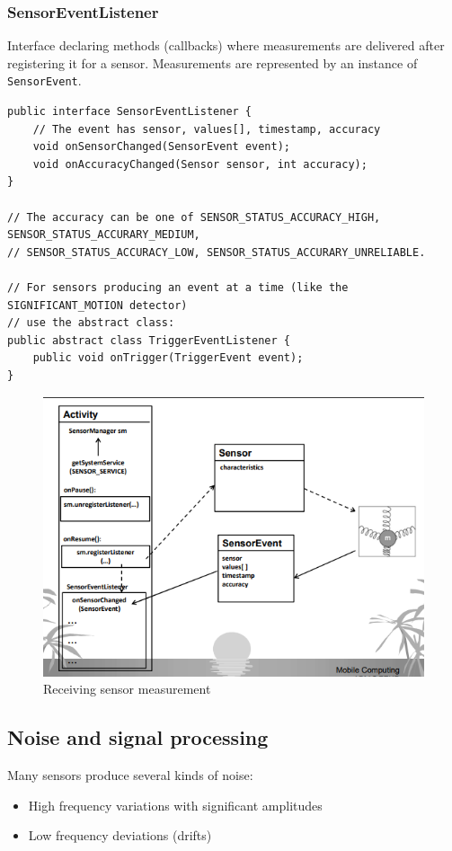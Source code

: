 \subsubsection{SensorEventListener}
Interface declaring methods (callbacks) where measurements are
delivered after registering it for a sensor.
Measurements are represented by an instance of \texttt{SensorEvent}. 

\begin{lstlisting}
public interface SensorEventListener {
    // The event has sensor, values[], timestamp, accuracy
    void onSensorChanged(SensorEvent event);
    void onAccuracyChanged(Sensor sensor, int accuracy);
}

// The accuracy can be one of SENSOR_STATUS_ACCURACY_HIGH, SENSOR_STATUS_ACCURARY_MEDIUM,
// SENSOR_STATUS_ACCURACY_LOW, SENSOR_STATUS_ACCURARY_UNRELIABLE. 

// For sensors producing an event at a time (like the SIGNIFICANT_MOTION detector)
// use the abstract class:
public abstract class TriggerEventListener {
    public void onTrigger(TriggerEvent event);
}
\end{lstlisting}  

\begin{figure}[h]
\centering
\includegraphics[width=0.8\linewidth]{figures/07_receiving_sensor_measurement.png}
\caption{Receiving sensor measurement}
\label{fig:receiving sensor measurement}
\end{figure}

\subsection{Noise and signal processing}

Many sensors produce several kinds of noise:
\begin{itemize}
    \item High frequency variations with significant amplitudes 
    \item Low frequency deviations (drifts)
\end{itemize} 

